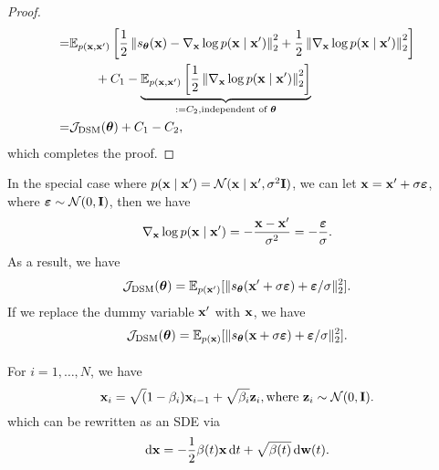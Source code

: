\begin{proof}
\begin{equation*}
\begin{aligned}
			=                            & \mathbb{E}_{p(\mathbf{x},\mathbf{x}')}\left[\frac{1}{2}\left\|s_{\boldsymbol{\theta}}(\mathbf{x})-\nabla_{\mathbf{x}}\log p(\mathbf{x}\mid\mathbf{x}')\right\|_{2}^{2}+\frac{1}{2}\left\|\nabla_{\mathbf{x}}\log p(\mathbf{x}\mid\mathbf{x}')\right\|_{2}^{2}\right] \\
			                             & \qquad+C_{1}-\underbrace{\mathbb{E}_{p(\mathbf{x},\mathbf{x}')}\left[\frac{1}{2}\left\|\nabla_{\mathbf{x}}\log p(\mathbf{x}\mid\mathbf{x}')\right\|_{2}^{2}\right]}_{:=C_{2},\text{independent of }\boldsymbol{\theta}}                      \\
			=                            & \mathcal{J}_{\text{DSM}}(\boldsymbol{\theta})+C_{1}-C_{2},
		\end{aligned}
	\end{equation*}
	which completes the proof.
\end{proof}

In the special case where \(p(\mathbf{x}\mid\mathbf{x}')=\mathcal{N}(\mathbf{x}\mid\mathbf{x}',\sigma^{2}\mathbf{I})\), we can let \(\mathbf{x}=\mathbf{x}'+\sigma\boldsymbol{\varepsilon}\), where \(\boldsymbol{\varepsilon}\sim\mathcal{N}(0,\mathbf{I})\), then we have
\begin{equation*}
	\nabla_{\mathbf{x}}\log p(\mathbf{x}\mid\mathbf{x}')=-\frac{\mathbf{x}-\mathbf{x}'}{\sigma^{2}}=-\frac{\boldsymbol{\varepsilon}}{\sigma}.
\end{equation*}
As a result, we have
\begin{equation*}
	\mathcal{J}_{\text{DSM}}(\boldsymbol{\theta})=\mathbb{E}_{p(\mathbf{x}')}[\|s_{\boldsymbol{\theta}}(\mathbf{x}'+\sigma\boldsymbol{\varepsilon})+\boldsymbol{\varepsilon}/\sigma\|_{2}^{2}].
\end{equation*}
If we replace the dummy variable \(\mathbf{x}'\) with \(\mathbf{x}\), we have
\begin{equation*}
	\mathcal{J}_{\text{DSM}}(\boldsymbol{\theta})=\mathbb{E}_{p(\mathbf{x})}[\|s_{\boldsymbol{\theta}}(\mathbf{x}+\sigma\boldsymbol{\varepsilon})+\boldsymbol{\varepsilon}/\sigma\|_{2}^{2}].
\end{equation*}

\paragraph{}

\begin{example}
	For \(i=1,\ldots,N\), we have
	\begin{equation*}
		\mathbf{x}_i=\sqrt(1-\beta_{i})\mathbf{x}_{i-1}+\sqrt{\beta_{i}}\mathbf{z}_{i},\text{where }\mathbf{z}_{i}\sim\mathcal{N}(0,\mathbf{I}).
	\end{equation*}
	which can be rewritten as an SDE via
	\begin{equation*}
		\mathop{}\!\mathrm{d}\mathbf{x}=-\frac{1}{2}\beta(t)\mathbf{x}\mathop{}\!\mathrm{d} t+\sqrt{\beta(t)}\mathop{}\!\mathrm{d}\mathbf{w}(t).
	\end{equation*}
\end{example}

